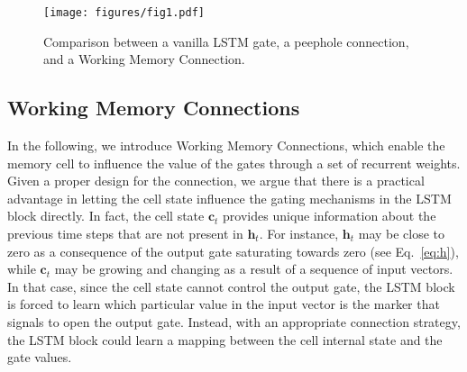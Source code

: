 
\begin{figure*}[!t]
    \centering
    \texttt{[image: figures/fig1.pdf]}
    \caption{Comparison between a vanilla LSTM gate, a peephole connection, and a Working Memory Connection.}
\label{fig:1a}
\end{figure*}

\subsection{Working Memory Connections}
In the following, we introduce Working Memory Connections, which enable the memory cell to influence the value of the gates through a set of recurrent weights. Given a proper design for the connection, we argue that there is a practical advantage in letting the cell state influence the gating mechanisms in the LSTM block directly. In fact, the cell state $\mathbf{c}_t$ provides unique information about the previous time steps that are not present in $\mathbf{h}_t$. 
%
For instance, $\mathbf{h}_t$ may be close to zero as a consequence of the output gate saturating towards zero (see Eq.~\ref{eq:h}), while $\mathbf{c}_t$ may be growing and changing as a result of a sequence of input vectors. In that case, since the cell state cannot control the output gate, the LSTM block is forced to learn which particular value in the input vector is the marker that signals to open the output gate. Instead, with an appropriate connection strategy, the LSTM block could learn a mapping between the cell internal state and the gate values.

